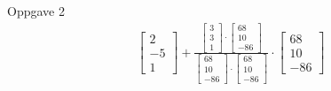 \documentclass[11pt, a4paper, norsk]{article}
\begin{document}
\begin{Example}{Oppgave 2}{}
\begin{align*}
\begin{bmatrix}
                    2 \\
                    -5 \\
                    1
                \end{bmatrix} + \frac{\begin{bmatrix}
                    3 \\
                    3 \\
                    1
                \end{bmatrix} \cdot \begin{bmatrix}
                    68 \\
                    10 \\
                    -86
                \end{bmatrix}}{\begin{bmatrix}
                    68 \\
                    10 \\
                    -86
                \end{bmatrix} \cdot \begin{bmatrix}
                    68 \\
                    10 \\
                    -86
                \end{bmatrix}} \cdot \begin{bmatrix}
                    68 \\
                    10 \\
                    -86
                \end{bmatrix}
                \end{align*}
               \end{Example}
\end{document}
